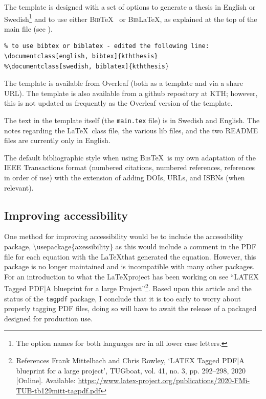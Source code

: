 The template is designed with a set of options to generate a thesis in English or Swedish\footnote{The option names for both languages are in all lower case letters.} and to use either \textsc{Bib}\TeX~ or \textsc{Bib}\LaTeX, as explained at the top of the main file (see ).
\begin{lstlisting}[language={[LaTeX]TeX}, caption={\textbackslash documentclass}, label=lst:document]
%% set the default language to english or swedish by passing an option to the documentclass - this handles the inside tile page
% to use bibtex or biblatex - edited the following line:
\documentclass[english, bibtex]{kththesis}
%\documentclass[swedish, biblatex]{kththesis}
\end{lstlisting}

The template is available from Overleaf (both as a template and via a share URL). The template is also available from a github repository at KTH; however, this is not updated as frequently as the Overleaf version of the template.

The text in the template itself (\ie the \texttt{main.tex} file) is in Swedish and English. The notes regarding the \LaTeX~class file, the various lib files, and the two README files are currently only in English.

The default bibliographic style when using \textsc{Bib}\TeX~is my own adaptation of the IEEE Transactions format (\ie numbered citations, numbered references, references in order of use) with the extension of adding DOIs, URLs, and ISBNs (when relevant).

\subsection{Improving accessibility}
\label{sec:improvingAccessibility}
One method for improving accessibility would be to include the accessibility package, \ie \textbackslash usepackage\{axessibility\} as this would include a comment in the PDF file for each equation with the \LaTeX that generated the equation. However, this package is no longer maintained and is incompatible with many other packages. For an introduction to what the \LaTeX\;project has been working on see “LATEX Tagged PDF|A blueprint for a large Project”\footnote{References
Frank Mittelbach and Chris Rowley, ‘LATEX Tagged PDF|A blueprint for a large project’, TUGboat, vol. 41, no. 3, pp. 292–298, 2020 [Online]. Available: \url{https://www.latex-project.org/publications/2020-FMi-TUB-tb129mitt-tagpdf.pdf}}. Based upon this article and the status of the \texttt{tagpdf} package, I conclude that it is too early to worry about properly tagging PDF files, doing so will have to await the release of a packaged designed for production use.

